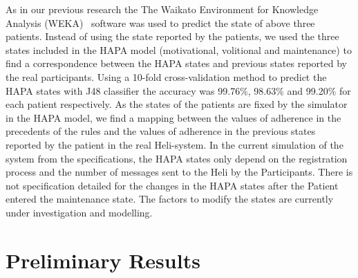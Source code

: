 \documentclass[graybox]{svmult}
\begin{document}
As in our previous research the The Waikato Environment for Knowledge Analysis (WEKA)~\cite{WEKA} software was used to predict the state of above three patients. Instead of using the state reported by the patients, we used the three states included in the HAPA model (motivational, volitional and maintenance) to find a correspondence between the HAPA states and previous states reported by the real participants.  Using a 10-fold cross-validation method to predict the HAPA states with J48 classifier the accuracy was  99.76\%, 98.63\% and 99.20\% for each patient respectively. As the states of the patients are fixed by the simulator in the HAPA model, we find a mapping between the values of adherence in the precedents of the rules and the values of adherence in the previous states reported by the patient in the real Heli-system. In the current simulation of the system from the specifications, the HAPA states only depend on the registration process and the number of messages sent to the Heli by the Participants. There is not specification detailed for the changes in the HAPA states after the Patient entered the maintenance state. The factors to modify the states are currently under investigation and modelling.

\section {Preliminary Results}
\label{sec.results}
\end{document}
